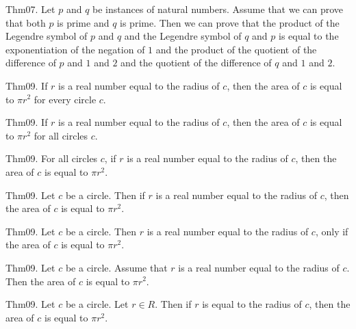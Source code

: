 \documentclass{article}
\begin{document}
Thm07. Let $p$ and $q$ be instances of natural numbers. Assume that we can prove that both $p$ is prime and $q$ is prime. Then we can prove that the product of the Legendre symbol of $p$ and $q$ and the Legendre symbol of $q$ and $p$ is equal to the exponentiation of the negation of $1$ and the product of the quotient of the difference of $p$ and $1$ and $2$ and the quotient of the difference of $q$ and $1$ and $2$.

Thm09. If $r$ is a real number equal to the radius of $c$, then the area of $c$ is equal to $\pi r ^ {2}$ for every circle $c$.

Thm09. If $r$ is a real number equal to the radius of $c$, then the area of $c$ is equal to $\pi r ^ {2}$ for all circles $c$.

Thm09. For all circles $c$, if $r$ is a real number equal to the radius of $c$, then the area of $c$ is equal to $\pi r ^ {2}$.

Thm09. Let $c$ be a circle. Then if $r$ is a real number equal to the radius of $c$, then the area of $c$ is equal to $\pi r ^ {2}$.

Thm09. Let $c$ be a circle. Then $r$ is a real number equal to the radius of $c$, only if the area of $c$ is equal to $\pi r ^ {2}$.

Thm09. Let $c$ be a circle. Assume that $r$ is a real number equal to the radius of $c$. Then the area of $c$ is equal to $\pi r ^ {2}$.

Thm09. Let $c$ be a circle. Let $r \in R$. Then if $r$ is equal to the radius of $c$, then the area of $c$ is equal to $\pi r ^ {2}$.
\end{document}
